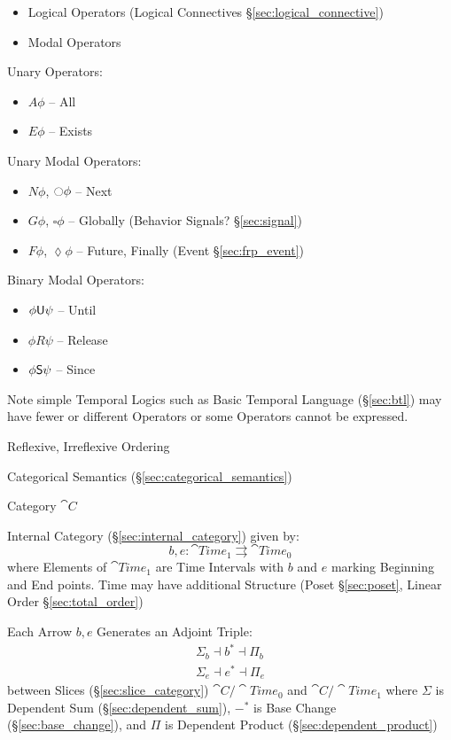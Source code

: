 \begin{itemize}
  \item Logical Operators (Logical Connectives
    \S\ref{sec:logical_connective})
  \item Modal Operators
\end{itemize}


Unary Operators:
\begin{itemize}
  \item $A\phi$ -- All
  \item $E\phi$ -- Exists
\end{itemize}

Unary Modal Operators:
\begin{itemize}
  \item $N\phi$, $\ocircle\phi$ -- Next
  \item $G\phi$, $\square\phi$ -- Globally (Behavior
    Signals? \S\ref{sec:signal}) %
  \item $F\phi$, $\lozenge\phi$ -- Future, Finally (Event
    \S\ref{sec:frp_event})
\end{itemize}

Binary Modal Operators:
\begin{itemize}
  \item $\phi \mathsf{U} \psi$ -- Until
  \item $\phi R \psi$ -- Release
  \item $\phi \mathsf{S} \psi$ -- Since
\end{itemize}

\fist Note simple Temporal Logics such as Basic Temporal Language
(\S\ref{sec:btl}) may have fewer or different Operators or some
Operators cannot be expressed.

Reflexive, Irreflexive Ordering


\asterism


Categorical Semantics (\S\ref{sec:categorical_semantics})

Category $\cat{C}$

Internal Category (\S\ref{sec:internal_category}) given by:
\[
  b,e : \cat{Time}_1 \rightrightarrows \cat{Time}_0
\]
where Elements of $\cat{Time}_1$ are Time Intervals with $b$ and $e$
marking Beginning and End points. Time may have additional Structure
(Poset \S\ref{sec:poset}, Linear Order \S\ref{sec:total_order})

Each Arrow $b,e$ Generates an Adjoint Triple:
\begin{align*}
  \Sigma_b \dashv b^* \dashv \Pi_b \\
  \Sigma_e \dashv e^* \dashv \Pi_e
\end{align*}
between Slices (\S\ref{sec:slice_category}) $\cat{C}/\cat{Time}_0$ and
$\cat{C}/\cat{Time}_1$ where $\Sigma$ is Dependent Sum
(\S\ref{sec:dependent_sum}), $-^*$ is Base Change
(\S\ref{sec:base_change}), and $\Pi$ is Dependent Product
(\S\ref{sec:dependent_product})

